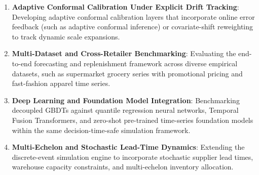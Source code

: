 \begin{enumerate}
    \item \textbf{Adaptive Conformal Calibration Under Explicit Drift Tracking}: Developing adaptive conformal calibration layers that incorporate online error feedback (such as adaptive conformal inference) or covariate-shift reweighting to track dynamic scale expansions.
    \item \textbf{Multi-Dataset and Cross-Retailer Benchmarking}: Evaluating the end-to-end forecasting and replenishment framework across diverse empirical datasets, such as supermarket grocery series with promotional pricing and fast-fashion apparel time series.
    \item \textbf{Deep Learning and Foundation Model Integration}: Benchmarking decoupled GBDTs against quantile regression neural networks, Temporal Fusion Transformers, and zero-shot pre-trained time-series foundation models within the same decision-time-safe simulation framework.
    \item \textbf{Multi-Echelon and Stochastic Lead-Time Dynamics}: Extending the discrete-event simulation engine to incorporate stochastic supplier lead times, warehouse capacity constraints, and multi-echelon inventory allocation.
\end{enumerate}
